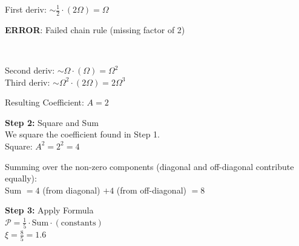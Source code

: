 \begin{minipage}{\linewidth}
\begin{tcolorbox}[
    title={\textbf{IPhO 2018 Q1}},
    colback=white,
    colframe=gray!50!black,
    arc=3pt,
    boxrule=1pt,
    fonttitle=\sffamily\large,
    width=\linewidth
]
\begin{minipage}[t]{0.49\linewidth}
\begin{tcolorbox}
            First deriv:  $\sim \frac{1}{2} \cdot (2\Omega) = \Omega$\\
            
            \vspace{0.3em}
            \colorbox{red!15}{\parbox{\linewidth}{\textcolor{red!80!black}{\textbf{ERROR}: Failed chain rule (missing factor of 2)}}}\\
            \vspace{0.3em}
            
            Second deriv: $\sim \Omega \cdot (\Omega) = \Omega^2$\\
            Third deriv:  $\sim \Omega^2 \cdot (2\Omega) = 2\Omega^3$
            \vspace{1em}
            
            Resulting Coefficient: $A = 2$
            \vspace{1em}
            
            \textbf{\textcolor{blue!60!black}{Step 2:}} Square and Sum\\
            We square the coefficient found in Step 1.\\
            Square: $A^2 = 2^2 = 4$
            \vspace{0.5em}
            
            Summing over the non-zero components (diagonal and off-diagonal contribute equally):\\
            Sum $= 4$ (from diagonal) $+ 4$ (from off-diagonal) $= 8$
            \vspace{1em}
            
            \textbf{\textcolor{blue!60!black}{Step 3:}} Apply Formula\\
            $\mathcal{P} = \frac{1}{5} \cdot \text{Sum} \cdot (\text{constants})$\\
            $\xi = \frac{8}{5} = 1.6$
            \vspace{1em}
            

\end{tcolorbox}
\end{minipage}
\end{tcolorbox}
\end{minipage}
